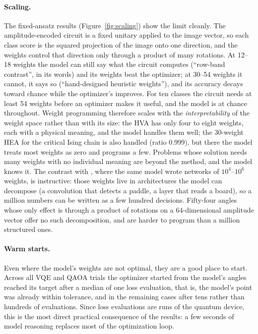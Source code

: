 \paragraph{Scaling.}
The fixed-ansatz results (Figure~\ref{fig:scaling}) show the limit cleanly. The amplitude-encoded circuit is a fixed unitary applied to the image vector, so each class score is the squared projection of the image onto one direction, and the weights control that direction only through a product of many rotations. At 12--18 weights the model can still say what the circuit computes (``row-band contrast'', in its words) and its weights beat the optimizer; at 30--54 weights it cannot, it says so (``hand-designed heuristic weights''), and its accuracy decays toward chance while the optimizer's improves. For ten classes the circuit needs at least 54 weights before an optimizer makes it useful, and the model is at chance throughout. Weight programming therefore scales with the \emph{interpretability} of the weight space rather than with its size: the HVA has only four to eight weights, each with a physical meaning, and the model handles them well; the 30-weight HEA for the critical Ising chain is also handled (ratio 0.999), but there the model treats most weights as zero and programs a few. Problems whose solution needs many weights with no individual meaning are beyond the method, and the model knows it. The contrast with \citet{takehi2026sparks}, where the same model wrote networks of $10^4$--$10^6$ weights, is instructive: those weights live in architectures the model can decompose (a convolution that detects a paddle, a layer that reads a board), so a million numbers can be written as a few hundred decisions. Fifty-four angles whose only effect is through a product of rotations on a $64$-dimensional amplitude vector offer no such decomposition, and are harder to program than a million structured ones.

\paragraph{Warm starts.}
Even where the model's weights are not optimal, they are a good place to start. Across all VQE and QAOA trials the optimizer started from the model's angles reached its target after a median of one loss evaluation, that is, the model's point was already within tolerance, and in the remaining cases after tens rather than hundreds of evaluations. Since loss evaluations are runs of the quantum device, this is the most direct practical consequence of the results: a few seconds of model reasoning replaces most of the optimization loop.

